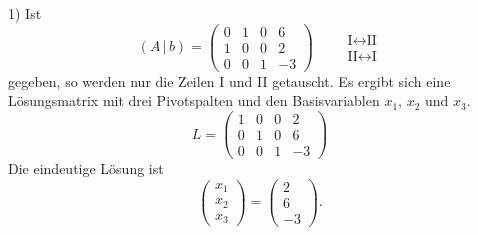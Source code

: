 1) Ist
\[ (A\,|\,b) = \left(\begin{array}{ccc|c} 0 & 1 & 0 & 6\\ 1 & 0 & 0 & 2\\ 0 & 0 & 1 & -3 \end{array}\right) \qquad \begin{array}{l} \text{I}\leftrightarrow\text{II}\\ \text{II}\leftrightarrow\text{I} \end{array} \]
gegeben, so werden nur die Zeilen I und II getauscht. Es ergibt sich eine Lösungsmatrix mit drei Pivotspalten und den Basisvariablen $x_1$, $x_2$ und $x_3$.
\[ L = \left(\begin{array}{ccc|c} 1 & 0 & 0 & 2\\ 0 & 1 & 0 & 6\\ 0 & 0 & 1 & -3 \end{array}\right) \]
Die eindeutige Lösung ist
\[ \begin{pmatrix} x_1 \\ x_2 \\ x_3 \end{pmatrix} = \begin{pmatrix} 2 \\ 6 \\ -3 \end{pmatrix} . \]

